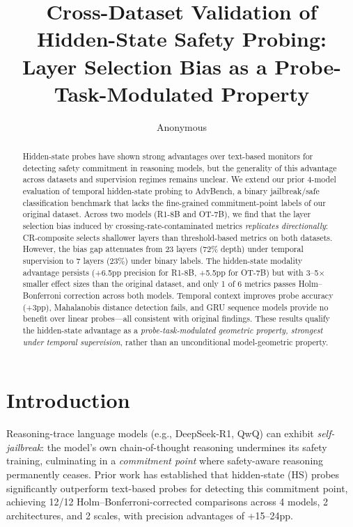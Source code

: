 \documentclass[11pt]{article}
\title{Cross-Dataset Validation of Hidden-State Safety Probing:\\Layer Selection Bias as a Probe-Task-Modulated Property}
\author{Anonymous}
\date{}
\begin{document}
\maketitle

\begin{abstract}
Hidden-state probes have shown strong advantages over text-based monitors for detecting safety commitment in reasoning models, but the generality of this advantage across datasets and supervision regimes remains unclear. We extend our prior 4-model evaluation of temporal hidden-state probing to AdvBench, a binary jailbreak/safe classification benchmark that lacks the fine-grained commitment-point labels of our original dataset. Across two models (R1-8B and OT-7B), we find that the layer selection bias induced by crossing-rate-contaminated metrics \emph{replicates directionally}: CR-composite selects shallower layers than threshold-based metrics on both datasets. However, the bias gap attenuates from 23 layers (72\% depth) under temporal supervision to 7 layers (23\%) under binary labels. The hidden-state modality advantage persists (+6.5pp precision for R1-8B, +5.5pp for OT-7B) but with 3--5$\times$ smaller effect sizes than the original dataset, and only 1 of 6 metrics passes Holm--Bonferroni correction across both models. Temporal context improves probe accuracy (+3pp), Mahalanobis distance detection fails, and GRU sequence models provide no benefit over linear probes---all consistent with original findings. These results qualify the hidden-state advantage as a \emph{probe-task-modulated geometric property, strongest under temporal supervision}, rather than an unconditional model-geometric property.
\end{abstract}

\section{Introduction}
\label{sec:intro}

Reasoning-trace language models (e.g., DeepSeek-R1, QwQ) can exhibit \emph{self-jailbreak}: the model's own chain-of-thought reasoning undermines its safety training, culminating in a \emph{commitment point} where safety-aware reasoning permanently ceases. Prior work has established that hidden-state (HS) probes significantly outperform text-based probes for detecting this commitment point, achieving 12/12 Holm--Bonferroni-corrected comparisons across 4 models, 2 architectures, and 2 scales, with precision advantages of +15--24pp.
\end{document}

